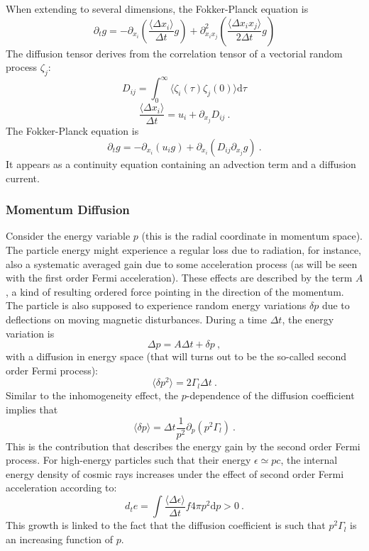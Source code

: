 \documentclass[12pt,a4paper]{article}
\newcommand{\dif}{\mathrm{d}}
\begin{document}
When extending to several dimensions, the Fokker-Planck equation is
\begin{equation}
\partial_t g = -\partial_{x_i} \left(\frac{\langle \Delta x_i \rangle}{\Delta t} g\right) +\partial^2_{x_i x_j} \left(\frac{\langle \Delta x_i x_j \rangle}{2\Delta t} g \right) 
\end{equation}
The diffusion tensor derives from the correlation tensor of a vectorial random process $\zeta_j$:
\begin{equation}
D_{ij} = \int_0^\infty \langle \zeta_i(\tau) \zeta_j(0) \rangle \dif \tau 
\end{equation}
\begin{equation}
\frac{\langle \Delta x_i \rangle}{\Delta t} = u_i +\partial_{x_j} D_{ij} ~.
\end{equation}
The Fokker-Planck equation is
\begin{equation}
\partial_t g = -\partial_{x_i} \left(u_i g\right) +\partial_{x_i} \left(D_{ij} \partial_{x_j} g \right) ~.
\end{equation}
It appears as a continuity equation containing an advection term and a diffusion current.

\subsubsection{Momentum Diffusion}
Consider the energy variable $p$ (this is the radial coordinate in momentum space). The particle energy might experience a regular loss due to radiation, for instance, also a systematic averaged gain due to some acceleration process (as will be seen with the first order Fermi acceleration). These effects are described by the term $A$, a kind of resulting ordered force pointing in the direction of the momentum. The particle is also supposed to experience random energy variations $\delta p$ due to deflections on moving magnetic disturbances. During a time $\Delta t$, the energy variation is
\begin{equation}
\Delta p = A \Delta t +\delta p ~,
\end{equation}
with a diffusion in energy space (that will turns out to be the so-called second order Fermi process):
\begin{equation}
\langle \delta p^2 \rangle = 2\Gamma_l \Delta t ~.
\end{equation}
Similar to the inhomogeneity effect, the $p$-dependence of the diffusion coefficient implies that
\begin{equation}
\langle \delta p \rangle = \Delta t \frac{1}{p^2} \partial_p (p^2 \Gamma_l) ~.
\end{equation}
This is the contribution that describes the energy gain by the second order Fermi process. For high-energy particles such that their energy $\epsilon \simeq pc$, the internal energy density of cosmic rays increases under the effect of second order Fermi acceleration according to:
\begin{equation}
d_t e = \int \frac{\langle \Delta \epsilon \rangle}{\Delta t} f 4\pi p^2 \dif p > 0 ~.
\end{equation}
This growth is linked to the fact that the diffusion coefficient is such that $p^2 \Gamma_l$ is an increasing function of $p$. 
\end{document}
